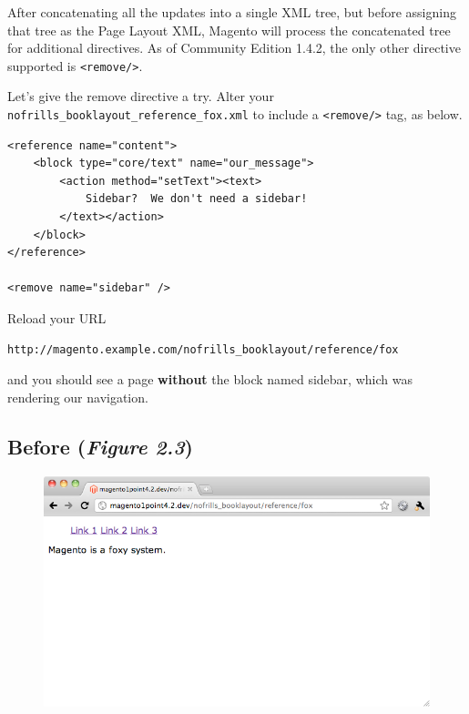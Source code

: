 \documentclass[oneside]{book}
\begin{document}
After concatenating all the updates into a single XML tree, but before assigning that tree as the Page Layout XML, Magento will process the concatenated tree for additional directives.  As of Community Edition 1.4.2, the only other directive supported is \footnotesize\texttt{\textless remove/\textgreater }\normalsize.  

Let's give the remove directive a try.  Alter your \footnotesize\texttt{nofrills\_booklayout\_reference\_fox.xml} \normalsize  to include a \footnotesize\texttt{\textless remove/\textgreater } \normalsize  tag, as below.

\begin{lstlisting}
<reference name="content">
    <block type="core/text" name="our_message">
        <action method="setText"><text>
            Sidebar?  We don't need a sidebar!
        </text></action>
    </block>
</reference>

<remove name="sidebar" />

\end{lstlisting}


Reload your URL

\begin{lstlisting}
http://magento.example.com/nofrills_booklayout/reference/fox

\end{lstlisting}


and you should see a page \textbf{without} the block named sidebar, which was rendering our navigation.  

\subsection{Before (\emph{Figure 2.3})}

\begin{figure}[htb]
\begin{center}
\leavevmode
\includegraphics[width=1\textwidth]{images/chapter2/before.png}
\end{center}
\caption{}
\end{figure}
\end{document}
